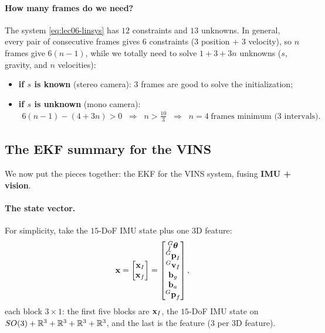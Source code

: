 \paragraph{How many frames do we need?} The system \eqref{eq:lec06-linsys} has $12$ constraints and $13$ unknowns. In general, every pair of consecutive frames gives $6$ constraints ($3$ position + $3$ velocity), so $n$ frames give $6(n-1)$, while we totally need to solve $1 + 3 + 3n$ unknowns ($s$, gravity, and $n$ velocities):
\begin{itemize}[noitemsep,topsep=2pt]
\item \textbf{if $s$ is known} (stereo camera): $3$ frames are good to solve the initialization;
\item \textbf{if $s$ is unknown} (mono camera):
\begin{align}
6(n-1) - (4 + 3n) > 0
\;\;\Rightarrow\;\;
n > \tfrac{10}{3}
\;\;\Rightarrow\;\;
n = 4 \;\text{frames minimum ($3$ intervals)}.
\end{align}
\end{itemize}

\subsection{The EKF summary for the VINS}
\label{sec:lec06-ekf-vins}

We now put the pieces together: the EKF for the VINS system, fusing \textbf{IMU + vision}.

\paragraph{The state vector.} For simplicity, take the $15$-DoF IMU state plus one 3D feature:
\begin{align}
\boldsymbol{\mathbf{x}} = \begin{bmatrix} \boldsymbol{\mathbf{x}}_I \\ \boldsymbol{\mathbf{x}}_f \end{bmatrix}
= \begin{bmatrix}
{}^{G}_{I}\boldsymbol{\mathbf{\theta}} \\ {}^{G}\boldsymbol{\mathbf{p}}_I \\ {}^{G}\boldsymbol{\mathbf{v}}_I \\ \boldsymbol{\mathbf{b}}_g \\ \boldsymbol{\mathbf{b}}_a \\ {}^{G}\boldsymbol{\mathbf{p}}_f
\end{bmatrix},
\end{align}
each block $3\times1$: the first five blocks are $\boldsymbol{\mathbf{x}}_I$, the $15$-DoF IMU state on $SO(3) + \mathbb{R}^3 + \mathbb{R}^3 + \mathbb{R}^3 + \mathbb{R}^3$, and the last is the feature ($3$ per 3D feature).

